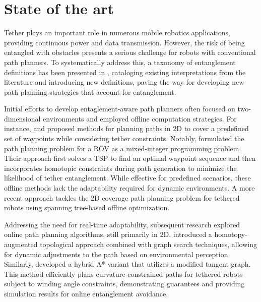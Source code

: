 \section{State of the art}
\label{sec:related_work}

Tether plays an important role in numerous mobile robotics applications, providing continuous power and data transmission. However, the risk of being entangled with obstacles presents a serious challenge for robots with conventional path planners. To systematically address this, a taxonomy of entanglement definitions has been presented in \cite{definitions}, cataloging existing interpretations from the literature and introducing new definitions, paving the way for developing new path planning strategies that account for entanglement.

Initial efforts to develop entaglement-aware path planners often focused on two-dimensional environments and employed offline computation strategies. For instance, \cite{rov_mccammon} and \cite{mechsy2017novel} proposed methods for planning paths in 2D to cover a predefined set of waypoints while considering tether constraints. Notably, \cite{mechsy2017novel} formulated the path planning problem for a \ac{ROV} as a mixed-integer programming problem. Their approach first solves a \ac{TSP} to find an optimal waypoint sequence and then incorporates homotopic constraints during path generation to minimize the likelihood of tether entanglement. While effective for predefined scenarios, these offline methods lack the adaptability required for dynamic environments. A more recent approach \cite{peng2025spanning} tackles the 2D coverage path planning problem for tethered robots using spanning tree-based offline optimization.

Addressing the need for real-time adaptability, subsequent research explored online path planning algorithms, still primarily in 2D. \cite{kim} introduced a homotopy-augmented topological approach combined with graph search techniques, allowing for dynamic adjustments to the path based on environmental perception. Similarly, \cite{withy} developed a hybrid A* variant that utilizes a modified tangent graph. This method efficiently plans curvature-constrained paths for tethered robots subject to winding angle constraints, demonstrating guarantees and providing simulation results for online entanglement avoidance. 


